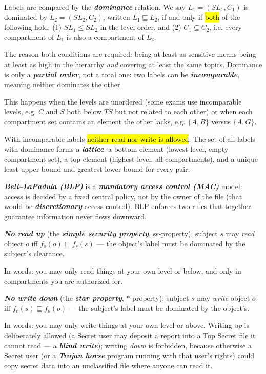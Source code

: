 \documentclass[12pt, a4paper]{article}
\newcommand{\term}[1]{\textbf{\textit{#1}}}        %
\newcommand{\imp}[1]{\hl{#1}}                       %
\begin{document}
Labels are compared by the \term{dominance} relation. We say $L_1 = (SL_1, C_1)$ is dominated by $L_2 = (SL_2, C_2)$, written $L_1 \sqsubseteq L_2$, if and only if \imp{both} of the following hold: (1) $SL_1 \leq SL_2$ in the level order, and (2) $C_1 \subseteq C_2$, i.e. every compartment of $L_1$ is also a compartment of $L_2$.

The reason both conditions are required: being at least as sensitive means being at least as high in the hierarchy \emph{and} covering at least the same topics. Dominance is only a \term{partial order}, not a total one: two labels can be \term{incomparable}, meaning neither dominates the other.

This happens when the levels are unordered (some exams use incomparable levels, e.g. $C$ and $S$ both below $TS$ but not related to each other) or when each compartment set contains an element the other lacks, e.g. $\{A, B\}$ versus $\{A, G\}$.

With incomparable labels \imp{neither read nor write is allowed}. The set of all labels with dominance forms a \term{lattice}: a bottom element (lowest level, empty compartment set), a top element (highest level, all compartments), and a unique least upper bound and greatest lower bound for every pair.

\term{Bell--LaPadula (BLP)} is a \term{mandatory access control (MAC)} model: access is decided by a fixed central policy, not by the owner of the file (that would be \term{discretionary} access control). BLP enforces two rules that together guarantee information never flows downward.

\term{No read up} (the \term{simple security property}, ss-property): subject $s$ may \emph{read} object $o$ iff $f_o(o) \sqsubseteq f_s(s)$ --- the object's label must be dominated by the subject's clearance.

In words: you may only read things at your own level or below, and only in compartments you are authorized for.

\term{No write down} (the \term{star property}, $*$-property): subject $s$ may \emph{write} object $o$ iff $f_c(s) \sqsubseteq f_o(o)$ --- the subject's label must be dominated by the object's.

In words: you may only write things at your own level or above. Writing \emph{up} is deliberately allowed (a Secret user may deposit a report into a Top Secret file it cannot read --- a \term{blind write}); writing \emph{down} is forbidden, because otherwise a Secret user (or a \term{Trojan horse} program running with that user's rights) could copy secret data into an unclassified file where anyone can read it.
\end{document}
